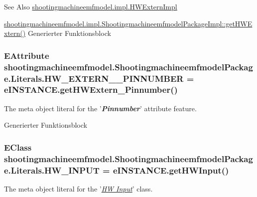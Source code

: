 \begin{DoxySeeAlso}{See Also}
\hyperlink{classshootingmachineemfmodel_1_1impl_1_1_h_w_extern_impl}{shootingmachineemfmodel.\-impl.\-H\-W\-Extern\-Impl} 

\hyperlink{classshootingmachineemfmodel_1_1impl_1_1_shootingmachineemfmodel_package_impl_aebd19ddfbfa5a16616e11c33e7d89eff}{shootingmachineemfmodel.\-impl.\-Shootingmachineemfmodel\-Package\-Impl\-::get\-H\-W\-Extern()} Generierter Funktionsblock 
\end{DoxySeeAlso}
\hypertarget{interfaceshootingmachineemfmodel_1_1_shootingmachineemfmodel_package_1_1_literals_acedf689d2322132a8d5c7d94d8cf5283}{
\subsubsection[{H\-W\-\_\-\-E\-X\-T\-E\-R\-N\-\_\-\-\_\-\-P\-I\-N\-N\-U\-M\-B\-E\-R}]{\setlength{\rightskip}{0pt plus 5cm}E\-Attribute shootingmachineemfmodel.\-Shootingmachineemfmodel\-Package.\-Literals.\-H\-W\-\_\-\-E\-X\-T\-E\-R\-N\-\_\-\-\_\-\-P\-I\-N\-N\-U\-M\-B\-E\-R = e\-I\-N\-S\-T\-A\-N\-C\-E.\-get\-H\-W\-Extern\-\_\-\-Pinnumber()}}\label{interfaceshootingmachineemfmodel_1_1_shootingmachineemfmodel_package_1_1_literals_acedf689d2322132a8d5c7d94d8cf5283}
The meta object literal for the '{\itshape {\bfseries Pinnumber}}' attribute feature.

Generierter Funktionsblock \hypertarget{interfaceshootingmachineemfmodel_1_1_shootingmachineemfmodel_package_1_1_literals_a6e76f89e5af98b966439f2e0f19b6fc1}{
\subsubsection[{H\-W\-\_\-\-I\-N\-P\-U\-T}]{\setlength{\rightskip}{0pt plus 5cm}E\-Class shootingmachineemfmodel.\-Shootingmachineemfmodel\-Package.\-Literals.\-H\-W\-\_\-\-I\-N\-P\-U\-T = e\-I\-N\-S\-T\-A\-N\-C\-E.\-get\-H\-W\-Input()}}\label{interfaceshootingmachineemfmodel_1_1_shootingmachineemfmodel_package_1_1_literals_a6e76f89e5af98b966439f2e0f19b6fc1}
The meta object literal for the '\hyperlink{classshootingmachineemfmodel_1_1impl_1_1_h_w_input_impl}{{\itshape H\-W Input}}' class.

